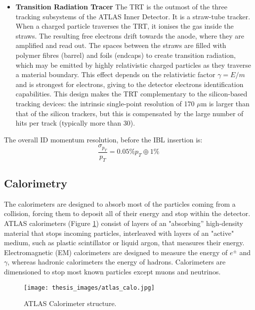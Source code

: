 \documentclass[a4paper, oneside, 11pt, openright]{book}
\begin{document}
\begin{itemize}
					\item \textbf{Transition Radiation Tracer} 
						The TRT is the outmost of the three tracking subsystems of the ATLAS Inner Detector. It is a straw-tube tracker. When a charged particle traverses the TRT, it ionises the gas inside the straws. The resulting free electrons drift towards the anode, where they are amplified and read out. The spaces between the straws are filled with polymer fibres (barrel) and foils (endcaps) to create transition radiation, which may be emitted by highly relativistic charged particles as they traverse a material boundary. This effect depends on the relativistic factor $\gamma=E/m$ and is strongest for electrons, giving to the detector electrons identification capabilities. This design  makes the TRT complementary to  the silicon-based tracking devices:  the intrinsic single-point resolution of 170 $\mu$m is larger than that of the silicon trackers, but this is compensated by the large number of hits per track (typically more than 30). 
				\end{itemize}
				The overall ID momentum resolution, before the IBL insertion is:
				$$
				\frac{\sigma_{p_T}}{p_T} = 0.05\% p_T \oplus 1 \%
				$$
			\subsection{Calorimetry}
				The calorimeters are designed to absorb most of the particles coming from a collision, forcing them to deposit all of their energy and stop within the detector.  ATLAS calorimeters \cite{ATLAS_DESIGN_2008} (Figure \ref{fig:all_calo_struct}) consist of layers of an "absorbing” high-density material that stops incoming particles, interleaved with layers of an "active" medium, such as plastic scintillator or liquid argon, that measures their energy. Electromagnetic (EM) calorimeters are designed to measure the energy of $e^{\pm}$ and $\gamma$, whereas hadronic calorimeters the energy of hadrons. Calorimeters are dimensioned to stop most known particles except muons and neutrinos.
				\begin{figure}
					\centering
					\texttt{[image: thesis\_images/atlas\_calo.jpg]}
					\caption{ATLAS Calorimeter structure.}
					\label{fig:all_calo_struct}
				\end{figure}
\end{document}
